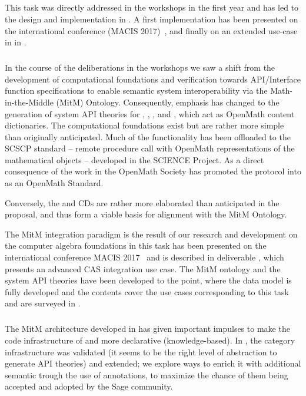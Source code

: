 \subparagraph{}
\label{dksbases@data-design}

This task was directly addressed in the  workshops in the first year and has led to the design and implementation in . A first implementation has been presented on the international conference (MACIS 2017)~\cite{WieKohRab:vtuimkb17}, and finally on an extended use-case in \LMFDB in .
 \medskip

\subparagraph{}
\label{dksbases@data-foundationCAS}

In the course of the deliberations in the  workshops we saw a shift from the development of computational foundations and verification towards API/Interface function specifications to enable semantic system interoperability via the Math-in-the-Middle (MitM) Ontology.
Consequently, emphasis has changed to the generation of system API theories for \GAP, \Sage, \Singular, and \LMFDB, which act as OpenMath content dictionaries.
The computational foundations exist but are rather more simple than originally anticipated.
Much of the functionality has been offloaded to the SCSCP standard -- remote procedure call with OpenMath representations of the mathematical objects -- developed in the SCIENCE Project.
As a direct consequence of the work in \pn the OpenMath Society has promoted the \SCSCP protocol into as an OpenMath Standard.

Conversely, the \GAP and \Sage CDs are rather more elaborated than anticipated in the proposal, and thus form a viable basis for alignment with the MitM Ontology.

The MitM integration paradigm is the result of our research and development on the computer algebra foundations in this task has been presented on the international conference MACIS 2017~\cite{KohMuePfe:kbimss17} and is described in deliverable , which presents an advanced CAS integration use case. 
The MitM ontology and the system API theories have been developed to the point, where the data model is fully developed and the contents cover the use cases corresponding to this task and  are surveyed in .
\medskip

\subparagraph{}
\label{dksbases@data-research-categories}

The MitM architecture developed in  has given important impulses to make the code infrastructure of \Sage and \GAP more declarative (knowledge-based).
In \Sage, the category infrastructure was validated (it seems to be the right level of abstraction to generate API theories) and extended; we explore ways to enrich it with additional semantic
trough the use of annotations, to maximize the chance of
them being accepted and adopted by the Sage community.

